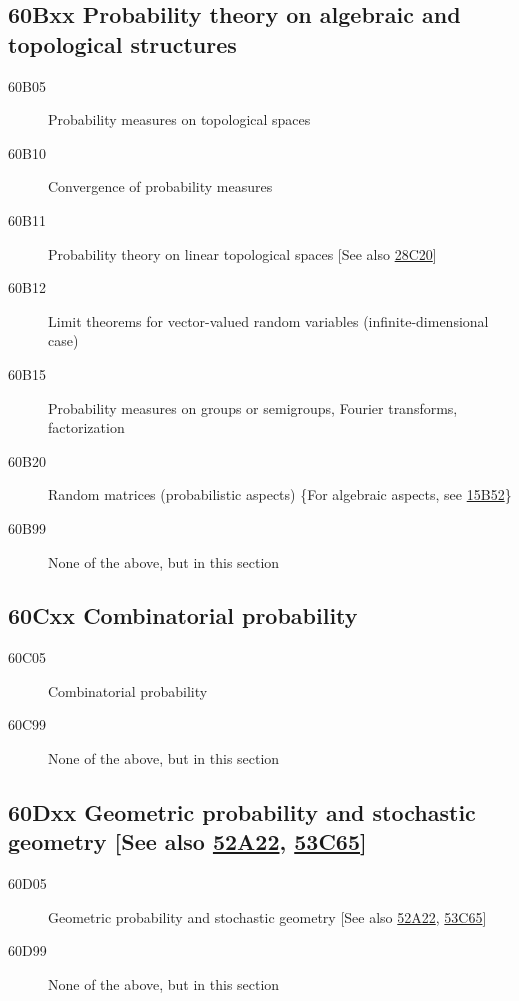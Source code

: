 \subsection*{60Bxx  Probability theory on algebraic and topological structures }\label{60Bxx}
\begin{description}  
\item [60B05]\label{60B05} Probability measures on topological spaces
\item [60B10]\label{60B10} Convergence of probability measures
\item [60B11]\label{60B11} Probability theory on linear topological spaces [See also \hyperref[28C20]{28C20}]
\item [60B12]\label{60B12} Limit theorems for vector-valued random variables (infinite-dimensional case)
\item [60B15]\label{60B15} Probability measures on groups or semigroups, Fourier transforms, factorization
\item [60B20]\label{60B20} Random matrices (probabilistic aspects) \{For algebraic aspects, see \hyperref[15B52]{15B52}\}
\item [60B99]\label{60B99} None of the above, but in this section
\end{description}
\subsection*{60Cxx  Combinatorial probability }\label{60Cxx}
\begin{description}  
\item [60C05]\label{60C05} Combinatorial probability
\item [60C99]\label{60C99} None of the above, but in this section
\end{description}
\subsection*{60Dxx  Geometric probability and stochastic geometry [See also \hyperref[52A22]{52A22}, \hyperref[53C65]{53C65}] }\label{60Dxx}
\begin{description}  
\item [60D05]\label{60D05} Geometric probability and stochastic geometry [See also \hyperref[52A22]{52A22}, \hyperref[53C65]{53C65}]
\item [60D99]\label{60D99} None of the above, but in this section
\end{description}
